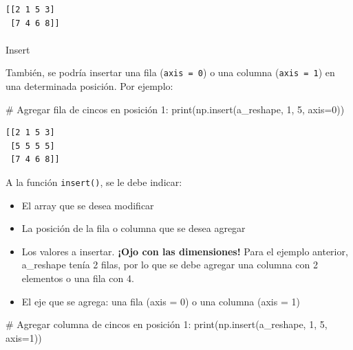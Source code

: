 \documentclass[
  letterpaper,
  DIV=11,
  numbers=noendperiod]{scrreprt}
\makeatletter
\let\oldparagraph\paragraph
\renewcommand{\paragraph}{
    \@ifstar
      \xxxParagraphStar
      \xxxParagraphNoStar
  }
\newcommand{\xxxParagraphStar}[1]{\oldparagraph*{#1}\mbox{}}
\newcommand{\xxxParagraphNoStar}[1]{\oldparagraph{#1}\mbox{}}
\newenvironment{Shaded}{\begin{snugshade}}{\end{snugshade}}
\newcommand{\BuiltInTok}[1]{\textcolor[rgb]{0.00,0.23,0.31}{#1}}
\newcommand{\CommentTok}[1]{\textcolor[rgb]{0.37,0.37,0.37}{#1}}
\newcommand{\DecValTok}[1]{\textcolor[rgb]{0.68,0.00,0.00}{#1}}
\newcommand{\NormalTok}[1]{\textcolor[rgb]{0.00,0.23,0.31}{#1}}
\newcommand{\OperatorTok}[1]{\textcolor[rgb]{0.37,0.37,0.37}{#1}}
\providecommand{\tightlist}{%
  \setlength{\itemsep}{0pt}\setlength{\parskip}{0pt}}\usepackage{longtable,booktabs,array}
\makeatother
\begin{document}
\begin{verbatim}
[[2 1 5 3]
 [7 4 6 8]]
\end{verbatim}

\paragraph{Insert}\label{insert}

También, se podría insertar una fila (\texttt{axis\ =\ 0}) o una columna
(\texttt{axis\ =\ 1}) en una determinada posición. Por ejemplo:

\begin{Shaded}
\begin{Highlighting}[]
\CommentTok{\# Agregar fila de cincos en posición 1:}
\BuiltInTok{print}\NormalTok{(np.insert(a\_reshape, }\DecValTok{1}\NormalTok{, }\DecValTok{5}\NormalTok{, axis}\OperatorTok{=}\DecValTok{0}\NormalTok{))}
\end{Highlighting}
\end{Shaded}

\begin{verbatim}
[[2 1 5 3]
 [5 5 5 5]
 [7 4 6 8]]
\end{verbatim}

A la función \texttt{insert()}, se le debe indicar:\\

\begin{itemize}
\tightlist
\item
  El array que se desea modificar\\
\item
  La posición de la fila o columna que se desea agregar\\
\item
  Los valores a insertar. \textbf{¡Ojo con las dimensiones!} Para el
  ejemplo anterior, a\_reshape tenía 2 filas, por lo que se debe agregar
  una columna con 2 elementos o una fila con 4.\\
\item
  El eje que se agrega: una fila (axis = 0) o una columna (axis = 1)\\
\end{itemize}

\begin{Shaded}
\begin{Highlighting}[]
\CommentTok{\# Agregar columna de cincos en posición 1:}
\BuiltInTok{print}\NormalTok{(np.insert(a\_reshape, }\DecValTok{1}\NormalTok{, }\DecValTok{5}\NormalTok{, axis}\OperatorTok{=}\DecValTok{1}\NormalTok{))}
\end{Highlighting}
\end{Shaded}
\end{document}
